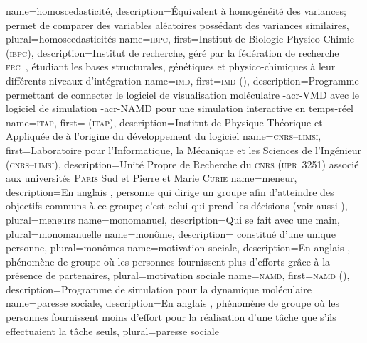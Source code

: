 %
{%
	name={homoscedasticité},%
	description={Équivalent à homogénéité des variances; permet de comparer des variables aléatoires possédant des variances similaires},%
	plural={homoscedasticités}%
}
%
{%
	name={\textsc{ibpc}},%
	first={Institut de Biologie Physico-Chimie (\textsc{ibpc})},%
	description={Institut de recherche, géré par la fédération de recherche \textsc{frc}~, étudiant les bases structurales, génétiques et physico-chimiques à leur différents niveaux d'intégration}%
}
%
{%
	name={\textsc{imd}},%
	first={\textsc{imd} ()},%
	description={Programme permettant de connecter le logiciel de visualisation moléculaire \myacro-{acr-VMD} avec le logiciel de simulation \myacro-{acr-NAMD} pour une simulation interactive en temps-réel }%
}
%
{%
	name={\textsc{itap}},%
	first={ (\textsc{itap})},%
	description={Institut de Physique Théorique et Appliquée de  à l'origine du développement du logiciel }%
}
%
{%
	name={\textsc{cnrs--limsi}},%
	first={Laboratoire pour l'Informatique, la Mécanique et les Sciences de l'Ingénieur (\textsc{cnrs--limsi})},%
	description={Unité Propre de Recherche du \textsc{cnrs} (\textsc{upr}~3251) associé aux universités \textsc{Paris} Sud et Pierre et Marie \textsc{Curie}}%
}
%
{%
	name={meneur},%
	description={En anglais , personne qui dirige un groupe afin d'atteindre des objectifs communs à ce groupe; c'est celui qui prend les décisions (voir aussi )},%
	plural={meneurs}%
}
%
{%
	name={monomanuel},%
	description={Qui se fait avec une main},%
	plural={monomanuelle}%
}
%
{%
	name={monôme},%
	description={ constitué d'une unique personne},%
	plural={monômes}%
}
%
{%
	name={motivation sociale},%
	description={En anglais  , phénomène de groupe où les personnes fournissent plus d'efforts grâce à la présence de partenaires},%
	plural={motivation sociale}%
}
%
{%
	name={\textsc{namd}},%
	first={\textsc{namd} ()},%
	description={Programme de simulation pour la dynamique moléculaire }%
}
%
{%
	name={paresse sociale},%
	description={En anglais  , phénomène de groupe où les personnes fournissent moins d'effort pour la réalisation d'une tâche que s'ils effectuaient la tâche seuls},%
	plural={paresse sociale}%
}
